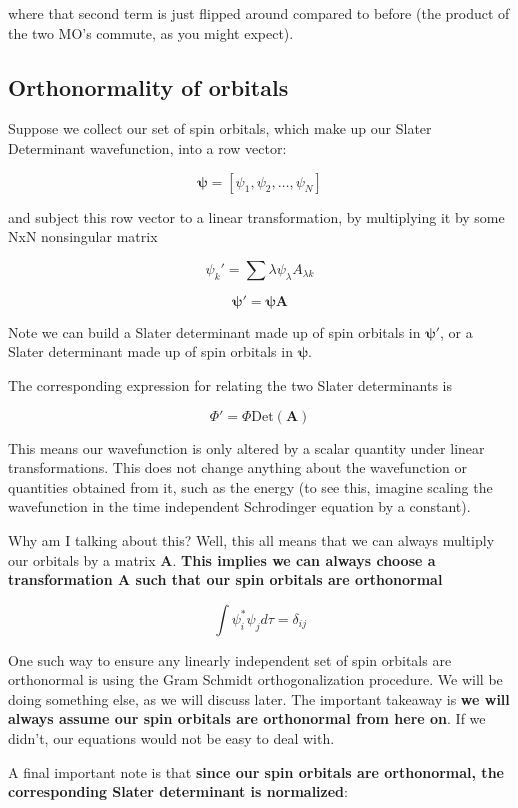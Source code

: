 \documentclass[11pt]{article}
\begin{document}
where that second term is just flipped around compared to before (the
product of the two MO's commute, as you might expect).

\subsection{Orthonormality of
orbitals}\label{orthonormality-of-orbitals}

Suppose we collect our set of spin orbitals, which make up our Slater
Determinant wavefunction, into a row vector:

\[\boldsymbol{\psi} = [\psi_1, \psi_2, \dots, \psi_N] \]

and subject this row vector to a linear transformation, by multiplying
it by some NxN nonsingular matrix

\[\psi_k' = \sum\lambda \psi_\lambda A_{\lambda k} \]

\[\boldsymbol{\psi'} = \boldsymbol{\psi} \boldsymbol{A}\]

Note we can build a Slater determinant made up of spin orbitals in
\(\boldsymbol{\psi'}\), or a Slater determinant made up of spin orbitals
in \(\boldsymbol{\psi}\).

The corresponding expression for relating the two Slater determinants is

\[\Phi' = \Phi \mathrm{Det}(\boldsymbol{A}) \]

This means our wavefunction is only altered by a scalar quantity under
linear transformations. This does not change anything about the
wavefunction or quantities obtained from it, such as the energy (to see
this, imagine scaling the wavefunction in the time independent
Schrodinger equation by a constant).

Why am I talking about this? Well, this all means that we can always
multiply our orbitals by a matrix \(\boldsymbol{A}\). \textbf{This
implies we can always choose a transformation \(\boldsymbol{A}\) such that our spin
orbitals are orthonormal}

\[\int \psi^*_i \psi_j d\tau = \delta_{ij} \]

One such way to ensure any linearly independent set of spin orbitals are
orthonormal is using the Gram Schmidt orthogonalization procedure. We
will be doing something else, as we will discuss later. The important
takeaway is \textbf{we will always assume our spin orbitals are
orthonormal from here on}. If we didn't, our equations would not be easy
to deal with.

A final important note is that \textbf{since our spin orbitals are
orthonormal, the corresponding Slater determinant is normalized}:
\end{document}
